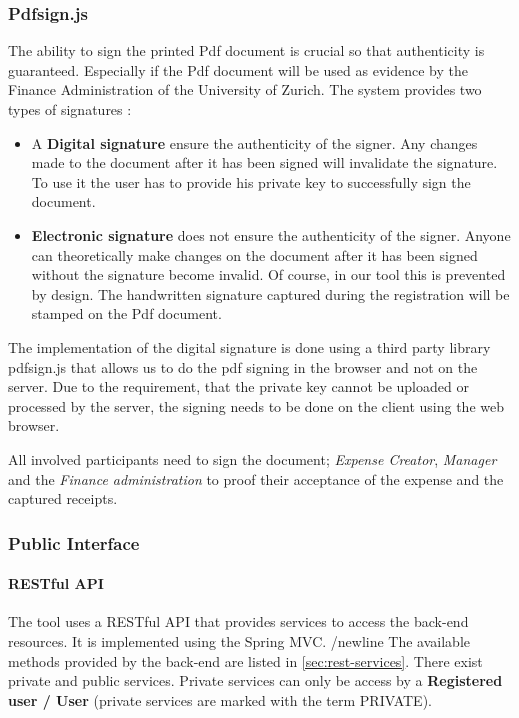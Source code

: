 \subsubsection{Pdfsign.js}
The ability to sign the printed Pdf document is crucial so that authenticity is guaranteed. Especially if the Pdf document will be used as evidence by the Finance Administration of the University of Zurich. The system provides two types of signatures \cite{arx-signature}:
\begin{itemize}
	\item A \textbf{Digital signature} ensure the authenticity of the signer. Any changes made to the document after it has been signed will invalidate the signature. To use it the user has to provide his private key to successfully sign the document.
	\item \textbf{Electronic signature} does not ensure the authenticity of the signer. Anyone can theoretically make changes on the document after it has been signed without the signature become invalid. Of course, in our tool this is prevented by design. The handwritten signature captured during the registration will be stamped on the Pdf document.
\end{itemize}\par

The implementation of the digital signature is done using a third party library pdfsign.js \cite{pdfsign} that allows us to do the pdf signing in the browser and not on the server. Due to the requirement, that the private key cannot be uploaded or processed by the server, the signing needs to be done on the client using the web browser.\par

All involved participants need to sign the document; \textit{Expense Creator}, \textit{Manager} and the \textit{Finance administration} to proof their acceptance of the expense and the captured receipts. \par

\subsubsection{Public Interface}

\paragraph{RESTful API}
\label{sec:restfulapi}
The tool uses a RESTful API that provides services to access the back-end resources. It is implemented using the Spring MVC. /newline
The available methods provided by the back-end are listed in \ref{sec:rest-services}. There exist private and public services. Private services can only be access by a \textbf{Registered user / User} (private services are marked with the term PRIVATE).

